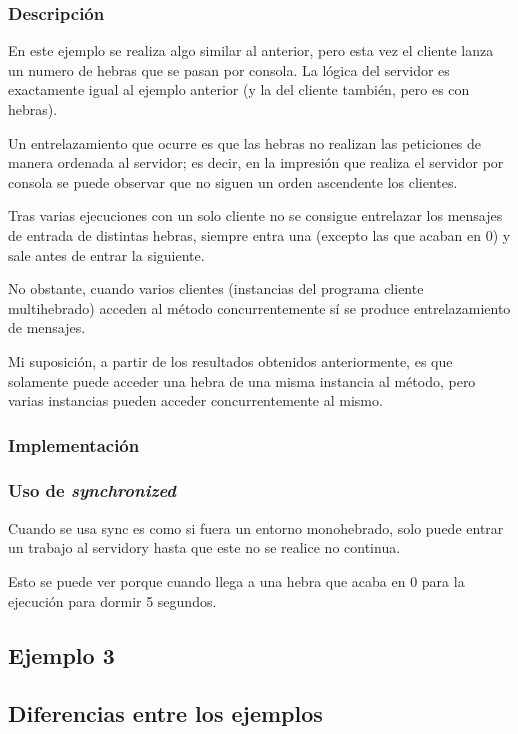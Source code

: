 \documentclass{article}
\begin{document}
\subsubsection{Descripción}
En este ejemplo se realiza algo similar al anterior, pero esta vez el cliente lanza un numero de hebras que se pasan por consola. La lógica del servidor es exactamente igual al ejemplo anterior (y la del cliente también, pero es con hebras).

Un entrelazamiento que ocurre es que las hebras no realizan las peticiones de manera ordenada al servidor; es decir, en la impresión que realiza el servidor por consola se puede observar que no siguen un orden ascendente los clientes.

Tras varias ejecuciones con un solo cliente no se consigue entrelazar los mensajes de entrada de distintas hebras, siempre entra una (excepto las que acaban en 0) y sale antes de entrar la siguiente.

No obstante, cuando varios clientes (instancias del programa cliente multihebrado) acceden al método concurrentemente sí se produce entrelazamiento de mensajes.


Mi suposición, a partir de los resultados obtenidos anteriormente, es que solamente puede acceder una hebra de una misma instancia al método, pero varias instancias pueden acceder concurrentemente al mismo.

\subsubsection{Implementación}

\subsubsection{Uso de \textit{synchronized}}
Cuando se usa sync es como si fuera un entorno monohebrado, solo puede entrar un trabajo al servidory hasta que este no se realice no continua.

Esto se puede ver porque cuando llega a una hebra que acaba en 0 para la ejecución para dormir 5 segundos.

\subsection{Ejemplo 3}

\subsection{Diferencias entre los ejemplos}
\end{document}
